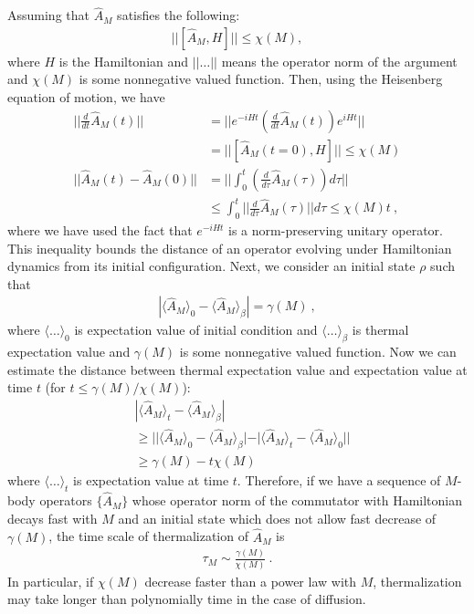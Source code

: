 \documentclass[twocolumn,superscriptaddress, prb]{revtex4-1}
\begin{document}
Assuming that $\hat{A}_M$ satisfies the following:
\begin{align}
||[\hat{A}_M, H]|| \leq \chi(M),
\end{align}
where $H$ is the Hamiltonian and $||\ldots||$ means the operator norm of the argument and $\chi(M)$ is some nonnegative valued function.
Then, using the Heisenberg equation of motion, we have
\begin{align}
\bigg|\bigg|\frac{d}{dt} \hat{A}_M(t)\bigg|\bigg| &= \bigg|\bigg| e^{-i H t} \left(\frac{d}{dt} \hat{A}_M (t)\right) e^{i H t} \bigg|\bigg| \nonumber\\
&= ||[\hat{A}_M(t = 0), H]|| \leq \chi(M) \\
||\hat{A}_M(t) - \hat{A}_M(0)|| &= \bigg|\bigg|\int_0^t \left(\frac{d}{d\tau} \hat{A}_M(\tau)\right)d\tau \bigg|\bigg| \nonumber\\
&\leq \int^t_0 \big|\big|\frac{d}{d\tau} \hat{A}_M(\tau)\big|\big|d\tau \leq \chi(M) t ~,
\end{align}
where we have used the fact that $e^{-iHt}$ is a norm-preserving unitary operator.
This inequality bounds the distance of an operator evolving under Hamiltonian dynamics
from its initial configuration. Next, we consider an initial state $\rho$ such that
\begin{align}
|\langle \hat{A}_M \rangle_0 - \langle \hat{A}_M \rangle_\beta| = \gamma(M) ~,
\end{align}
where $\langle \ldots \rangle_0$ is expectation value of initial condition and $\langle \ldots \rangle_\beta$
is thermal expectation value and $\gamma(M)$ is some nonnegative valued function.
Now we can estimate the distance between thermal expectation value and expectation value at time $t$ (for $t \leq \gamma(M)/\chi(M)$):
\begin{align}
&|\langle \hat{A}_M \rangle_t - \langle \hat{A}_M \rangle_\beta| \nonumber\\
&\geq ||\langle \hat{A}_M\rangle_0 - \langle \hat{A}_M\rangle_\beta | -|\langle \hat{A}_M\rangle_t - \langle \hat{A}_M\rangle_0 || \nonumber\\
&\geq \gamma(M) - t \chi(M)
\end{align}
where $\langle \ldots \rangle_t$ is expectation value at time $t$.
Therefore, if we have a sequence of $M$-body operators $\{ \hat{A}_M \}$
whose operator norm of the commutator with Hamiltonian decays fast with $M$
and an initial state which does not allow fast decrease of $\gamma(M)$,
the time scale of thermalization of $\hat{A}_M$ is
\begin{align}
\tau_M \sim \frac{\gamma(M)}{\chi(M)} ~.
\end{align}
In particular, if $\chi(M)$ decrease faster than a power law with $M$,
thermalization may take longer than polynomially time in the case of diffusion.
\end{document}
